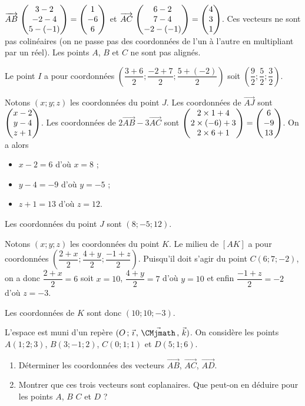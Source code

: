 \documentclass[11pt,fleqn, openany]{book} %
\begin{document}
\begin{solution}
$\coorde{AB}{3-2}{-2-4}{5-(-1)}=\coordbe{1}{-6}{6}$ et $\coorde{AC}{6-2}{7-4}{-2-(-1)}=\coordbe{4}{3}{1}$. Ces vecteurs ne sont pas colinéaires (on ne passe pas des coordonnées de l'un à l'autre en multipliant par un réel). Les points $A$, $B$ et $C$ ne sont pas alignés.

Le point $I$ a pour coordonnées $\left(\dfrac{3+6}{2} ; \dfrac{-2+7}{2}; \dfrac{5+(-2)}{2}\right)$ soit $\left(\dfrac{9}{2};\dfrac{5}{2};\dfrac{3}{2}\right)$.

Notons $(x;y;z)$ les coordonnées du point $J$. Les coordonnées de $\overrightarrow{AJ}$ sont $\coordbe{x-2}{y-4}{z+1}$. Les coordonnées de $2\overrightarrow{AB}-3\overrightarrow{AC}$ sont $\coordbe{2\times 1 + 4}{2\times (-6)+3}{2\times 6 + 1} = \coordbe{6}{-9}{13}$. On a alors

\begin{itemize}
\item $x-2=6$ d'où $x=8$ ;
\item $y-4=-9$ d'où $y=-5$ ;
\item $z+1=13$ d'où $z=12$.
\end{itemize}
Les coordonnées du point $J$ sont $(8;-5;12)$.

Notons $(x;y;z)$ les coordonnées du point $K$. Le milieu de $[AK]$ a pour coordonnées $\left( \dfrac{2+x}{2} ; \dfrac{4+y}{2} ; \dfrac{-1+z}{2}\right)$. Puisqu'il doit s'agir du point $C(6;7;-2)$, on a donc $\dfrac{2+x}{2}=6$ soit $x=10$, $\dfrac{4+y}{2}=7$ d'où  $y=10$ et enfin $\dfrac{-1+z}{2}=-2$ d'où $z=-3$.

Les coordonnées de $K$ sont donc $(10;10;-3)$.
\end{solution}



\begin{exercise}[topic=geo03]L'espace est muni d'un repère $\Oijk$. On considère les points $A(1;2;3)$, $B(3;-1;2)$, $C(0;1;1)$ et $D(5;1;6)$.
\begin{enumerate}
\item Déterminer les coordonnées des vecteurs $\overrightarrow{AB}$, $\overrightarrow{AC}$, $\overrightarrow{AD}$.
\item Montrer que ces trois vecteurs sont coplanaires. Que peut-on en déduire pour les points $A$, $B$ $C$ et $D$ ?
\end{enumerate}\end{exercise}
\end{document}
